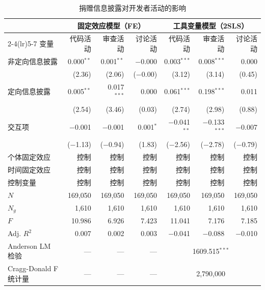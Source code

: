 \documentclass[
    type = master, %
    degree = professional,        %
    decl-page,  %
    twoside,                %
    fontset = fandol %
  ]{njuthesis}
\begin{document}
\begin{table}[htbp]
    \centering
    \caption{捐赠信息披露对开发者活动的影响}
    \label{tab:main-results}
    \small
    \begin{tabularx}{\textwidth}{Xrrrrrr}
        \toprule
        & \multicolumn{3}{c}{固定效应模型（FE）}
        & \multicolumn{3}{c}{工具变量模型（2SLS）} \\
        \cmidrule(lr){2-4}\cmidrule(lr){5-7}
        变量
            & 代码活动 & 审查活动 & 讨论活动
            & 代码活动 & 审查活动 & 讨论活动 \\
        \midrule
        非定向信息披露
            & 0.000$^{**}$  & 0.001$^{**}$  & $-$0.000
            & 0.003$^{***}$ & 0.008$^{***}$ & 0.000 \\
            & (2.36)        & (2.06)        & ($-$0.00)
            & (3.12)        & (3.14)        & (0.45) \\[0.4em]
        定向信息披露
            & 0.005$^{**}$  & 0.017$^{***}$ & 0.000
            & 0.061$^{***}$ & 0.198$^{***}$ & 0.011 \\
            & (2.54)        & (3.46)        & (0.03)
            & (2.74)        & (2.98)        & (0.88) \\[0.4em]
        交互项
            & $-$0.001      & $-$0.001      & 0.001$^{*}$
            & $-$0.041$^{**}$ & $-$0.133$^{***}$ & $-$0.007 \\
            & ($-$1.13)     & ($-$0.94)     & (1.83)
            & ($-$2.56)     & ($-$2.78)     & ($-$0.79) \\[0.4em]
        \midrule
        个体固定效应 & 控制 & 控制 & 控制 & 控制 & 控制 & 控制 \\
        时间固定效应 & 控制 & 控制 & 控制 & 控制 & 控制 & 控制 \\
        控制变量     & 控制 & 控制 & 控制 & 控制 & 控制 & 控制 \\
        \midrule
        $N$         & 169,050 & 169,050 & 169,050 & 169,050 & 169,050 & 169,050 \\
        $N_g$       & 1,610   & 1,610   & 1,610   & 1,610   & 1,610   & 1,610 \\
        $F$         & 10.986  & 6.926   & 7.423   & 11.041  & 7.176   & 7.185 \\
        Adj. $R^2$  & 0.007   & 0.002   & 0.003   & $-$0.041 & $-$0.088 & $-$0.010 \\
        Anderson LM 检验    & --- & --- & --- & \multicolumn{3}{c}{1609.515$^{***}$} \\
        Cragg-Donald F 统计量 & --- & --- & --- & \multicolumn{3}{c}{2,790,000} \\

\end{tabularx}
\end{table}
\end{document}
